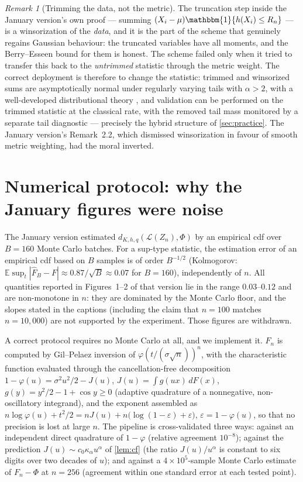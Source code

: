 \documentclass[11pt,a4paper]{article}
\theoremstyle{plain}
\theoremstyle{definition}
\theoremstyle{remark}
\newtheorem{remark}[theorem]{Remark}
\numberwithin{equation}{section}
\newcommand{\E}{\mathbb{E}}
\newcommand{\1}{\mathbbm{1}}
\newcommand{\h}{h}
\begin{document}
\begin{remark}[Trimming the data, not the metric]\label{rem:trim}
The truncation step inside the January version's own proof --- summing
$(X_i-\mu)\1\{\h(X_i)\le R_n\}$ --- is a winsorization of the \emph{data}, and it is
the part of the scheme that genuinely regains Gaussian behaviour: the truncated
variables have all moments, and the Berry--Esseen bound for them is honest. The scheme
failed only when it tried to transfer this back to the \emph{untrimmed} statistic
through the metric weight. The correct deployment is therefore to change the statistic:
trimmed and winsorized sums are asymptotically normal under regularly varying tails
with $\alpha>2$, with a well-developed distributional theory
\cite{CsorgoHaeuslerMason}, and validation can be performed on the trimmed statistic at
the classical rate, with the removed tail mass monitored by a separate tail diagnostic
--- precisely the hybrid structure of \cref{sec:practice}. The January version's
Remark~2.2, which dismissed winsorization in favour of smooth metric weighting, had the
moral inverted.
\end{remark}

\section{Numerical protocol: why the January figures were noise}\label{sec:numerics}

The January version estimated $d_{K,\h,q}(\mathcal L(Z_n),\Phi)$ by an empirical cdf
over $B=160$ Monte Carlo batches. For a sup-type statistic, the estimation error of an
empirical cdf based on $B$ samples is of order $B^{-1/2}$ (Kolmogorov:
$\E\sup_t|\widehat F_B-F|\approx 0.87/\sqrt B\approx 0.07$ for $B=160$), independently
of $n$. All quantities reported in Figures~1--2 of that version lie in the range
$0.03$--$0.12$ and are non-monotone in $n$: they are dominated by the Monte Carlo
floor, and the slopes stated in the captions (including the claim that $n=100$ matches
$n=10{,}000$) are not supported by the experiment. Those figures are withdrawn.

A correct protocol requires no Monte Carlo at all, and we implement it. $F_n$ is
computed by Gil--Pelaez inversion of $\varphi(t/(\sigma\sqrt n))^n$, with the
characteristic function evaluated through the cancellation-free decomposition
$1-\varphi(u)=\sigma^2u^2/2-J(u)$, $J(u)=\int g(ux)\,dF(x)$,
$g(y)=y^2/2-1+\cos y\ge0$ (adaptive quadrature of a nonnegative, non-oscillatory
integrand), and the exponent assembled as
$n\log\varphi(u)+t^2/2=nJ(u)+n\big(\log(1-\varepsilon)+\varepsilon\big)$,
$\varepsilon=1-\varphi(u)$, so that no precision is lost at large $n$. The pipeline is
cross-validated three ways: against an independent direct quadrature of $1-\varphi$
(relative agreement $10^{-8}$); against the prediction
$J(u)\sim c_0\kappa_\alpha u^\alpha$ of \cref{lem:cf} (the ratio $J(u)/u^\alpha$ is
constant to six digits over two decades of $u$); and against a $4\times10^5$-sample
Monte Carlo estimate of $F_n-\Phi$ at $n=256$ (agreement within one standard error at
each tested point).
\end{document}
